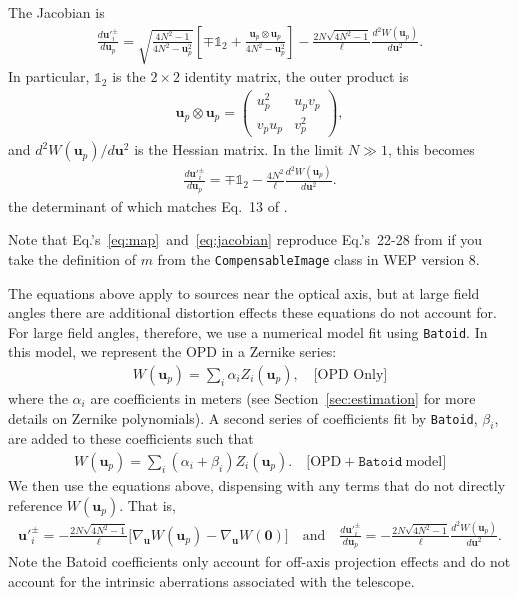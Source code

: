 \documentclass[TS,authoryear,toc]{lsstdoc}
\begin{document}
The Jacobian is
\begin{align}
    \frac{d\mathbf{u'}_{\!i}^\pm}{d\mathbf{u}_p} = 
    \sqrt{\frac{4N^2 - 1}{4N^2 - \mathbf{u}_p^2}} \left[
        \mp \mathds{1}_2 + \frac{\mathbf{u}_p \otimes \mathbf{u}_p}{4N^2 - \mathbf{u}_p^2}
    \right] - \frac{2N \sqrt{4N^2 - 1}}{\ell} \frac{d^2 W(\mathbf{u}_p)}{d \mathbf{u}^2}.
    \label{eq:jacobian}
\end{align}
In particular, $\mathds{1}_2$ is the $2 \times 2$ identity matrix, the outer product is
\begin{align}
    \mathbf{u}_p \otimes \mathbf{u}_p = 
    \begin{pmatrix}
        u_p^2   & u_p v_p \\
        v_p u_p & v_p^2
    \end{pmatrix},
\end{align}
and $d^2 W(\mathbf{u}_p) / d \mathbf{u}^2$ is the Hessian matrix.
In the limit $N \gg 1$, this becomes
\begin{align}
    \frac{d\mathbf{u'}_{\!i}^\pm}{d\mathbf{u}_p} = \mp \mathds{1}_2 - \frac{4 N^2}{\ell} \frac{d^2 W(\mathbf{u}_p)}{d \mathbf{u}^2}.
\end{align}
the determinant of which matches Eq.~13 of \citet{1993JOSAA..10.2277R}.

Note that Eq.'s~\ref{eq:map}~and~\ref{eq:jacobian} reproduce Eq.'s~22-28 from \citet{2015ApOpt..54.9045X} if you take the definition of $m$ from the \texttt{CompensableImage} class in WEP version 8.

The equations above apply to sources near the optical axis, but at large field angles there are additional distortion effects these equations do not account for.
For large field angles, therefore, we use a numerical model fit using \texttt{Batoid}.
In this model, we represent the OPD in a Zernike series:
\begin{align}
  W(\mathbf{u}_p) = \sum_i \alpha_i Z_i(\mathbf{u}_p),
  \quad \big[ \text{OPD Only} \big]
\end{align}
where the $\alpha_i$ are coefficients in meters (see Section~\ref{sec:estimation} for more details on Zernike polynomials).
A second series of coefficients fit by \texttt{Batoid}, $\beta_i$, are added to these coefficients such that
\begin{align}
  W(\mathbf{u}_p) = \sum_i (\alpha_i + \beta_i) Z_i(\mathbf{u}_p).
  \quad \big[ \text{OPD} + \texttt{Batoid}~\text{model} \big]
\end{align}
We then use the equations above, dispensing with any terms that do not directly reference $W(\mathbf{u}_p)$.
That is, 
\begin{align}
  \mathbf{u'}_{\!i}^\pm = - \frac{2 N \sqrt{4 N^2 - 1}}{\ell} \Big[ \nabla_\mathbf{u} W(\mathbf{u}_p) - \nabla_\mathbf{u} W(\mathbf{0}) \Big]
  \quad \text{and} \quad
  \frac{d\mathbf{u'}_{\!i}^\pm}{d\mathbf{u}_p} = - \frac{2N \sqrt{4N^2 - 1}}{\ell} \frac{d^2 W(\mathbf{u}_p)}{d \mathbf{u}^2}.
\end{align}
Note the Batoid coefficients only account for off-axis projection effects and do not account for the intrinsic aberrations associated with the telescope.
\end{document}
